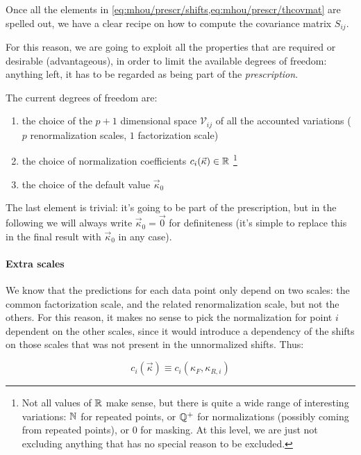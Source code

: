 
Once all the elements in \cref{eq:mhou/prescr/shifts,eq:mhou/prescr/thcovmat}
are spelled out, we have a clear recipe on how to compute the covariance matrix
$S_{ij}$.

For this reason, we are going to exploit all the properties that are required
or desirable (advantageous), in order to limit the available degrees of
freedom: anything left, it has to be regarded as being part of the
\textit{prescription}.

The current degrees of freedom are:

\begin{enumerate}
    \item the choice of the $p + 1$ dimensional space $\mathcal{V}_{ij}$ of all
        the accounted variations ($p$ renormalization scales, $1$ factorization
        scale)
    \item the choice of normalization coefficients $c_i(\vec{\kappa}) \in \mathbb{R}$
        \footnote{
            Not all values of $\mathbb{R}$ make sense, but there is quite a wide range
            of interesting variations: $\mathbb{N}$ for repeated points, or $\mathbb{Q}^+$ for
            normalizations (possibly coming from repeated points), or $0$ for
            masking.
            At this level, we are just not excluding anything that has no
            special reason to be excluded.
        }
    \item the choice of the default value $\vec{\kappa}_0$
\end{enumerate}

The last element is trivial: it's going to be part of the prescription, but in
the following we will always write $\vec{\kappa}_0 = \vec{0}$ for definiteness
(it's simple to replace this in the final result with $\vec{\kappa}_0$ in any
case).

\paragraph{Extra scales} We know that the predictions for each data point only
depend on two scales: the common factorization scale, and the related
renormalization scale, but not the others.
For this reason, it makes no sense to pick the normalization for point $i$
dependent on the other scales, since it would introduce a dependency of the
shifts on those scales that was not present in the unnormalized shifts.
Thus:

\begin{equation}
    \label{eq:mhou/prescr/2dim-norm}
    c_i(\vec{\kappa}) \equiv c_i(\kappa_F, \kappa_{R,i})
\end{equation}

